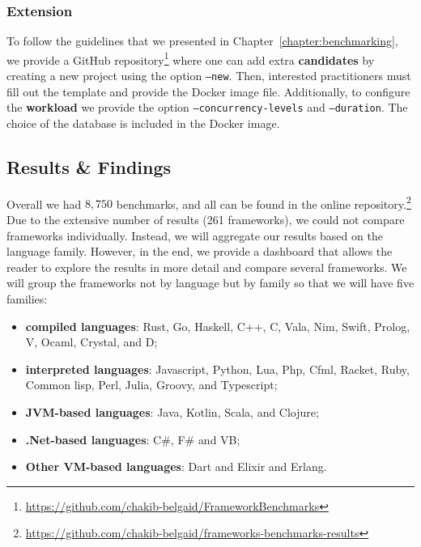 \subsubsection{Extension}
To follow the guidelines that we presented in Chapter~\ref{chapter:benchmarking}, we provide a GitHub repository\footnote{\url{https://github.com/chakib-belgaid/FrameworkBenchmarks}} where one can add extra \textbf{candidates} by creating a new project using the option \texttt{--new}.
Then, interested practitioners must fill out the template and provide the Docker image file.
Additionally, to configure the \textbf{workload} we provide the option \texttt{--concurrency-levels} and \texttt{--duration}.
The choice of the database is included in the Docker image.

\subsection{Results \& Findings}

Overall we had $8,750$ benchmarks, and all can be found in the online repository.\footnote{\url{https://github.com/chakib-belgaid/frameworks-benchmarks-results}}
Due to the extensive number of results (261 frameworks), we could not compare frameworks individually. Instead, we will aggregate our results based on the language family. However, in the end, we provide a dashboard that allows the reader to explore the results in more detail and compare several frameworks.
We will group the frameworks not by language but by family so that we will have five families:
\begin{itemize}
    \item \textbf{compiled languages}: Rust, Go, Haskell, C++, C, Vala, Nim, Swift, Prolog, V, Ocaml, Crystal, and D;
    \item \textbf{interpreted languages}: Javascript, Python, Lua, Php, Cfml, Racket, Ruby, Common lisp, Perl, Julia, Groovy, and Typescript;
    \item \textbf{JVM-based languages}: Java, Kotlin, Scala, and Clojure;
    \item \textbf{.Net-based languages}: C\#, F\# and VB;
    \item \textbf{Other VM-based languages}: Dart and Elixir and Erlang.
\end{itemize}

